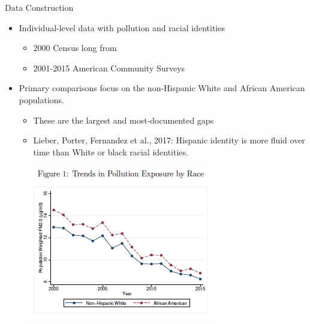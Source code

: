 \documentclass[dvipdfmx,12pt]{beamer}
\begin{document}
\begin{frame}{Data Construction}
  \begin{itemize}
    \item Individual-level data with pollution and racial identities
    \begin{itemize}
      \item 2000 Census long from
      \item 2001-2015 American Community Surveys
    \end{itemize}
    \item Primary comparisons focus on the non-Hispanic White and African American populations.
    \begin{itemize}
      \item These are the largest and most-documented gaps
      \item Lieber, Porter, Fernandez et al., 2017: Hispanic identity is more fluid over time than White or black racial identities.
    \end{itemize}
  \end{itemize}
\end{frame}

\begin{frame}{}
  \begin{figure}
    \centering
    \includegraphics[scale = 1]{F1.png}
  \end{figure}
\end{frame}
\end{document}

